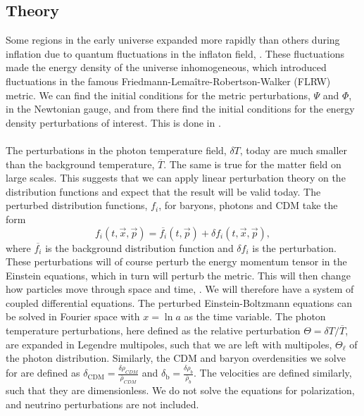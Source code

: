 \documentclass{aa}
\begin{document}
\subsection{Theory}
Some regions in the early universe expanded more rapidly than others during inflation due to quantum fluctuations in the inflaton field, \cite{winther:2023}. These fluctuations
made the energy density of the universe inhomogeneous, which introduced fluctuations in the famous Friedmann-Lemaître-Robertson-Walker (FLRW) metric. We can find the initial conditions for the metric perturbations, $\Psi$ and $\Phi$, in the Newtonian gauge, and from there find the initial conditions for
the energy density perturbations of interest. This is done in \cite{winther:2023}.\\
\noindent
\\
The perturbations in the photon temperature field, $\delta T$, today are much smaller than the background temperature, $\overline{T}$. The same is true for the matter field on large scales.
This suggests that we can apply linear perturbation theory on the distribution functions and expect 
that the result will be valid today. The perturbed distribution functions, $f_i$, for baryons, photons and CDM take the form \[f_i(t,\vec{x},\vec{p})
 = \overline{f_i}(t,\vec{p}) + \delta f_i(t,\vec{x},\vec{p}),\] where $\overline{f_i}$ is the background distribution function and $\delta f_i$ is the perturbation. These perturbations will of course perturb the 
energy momentum tensor in the Einstein equations, which in turn will perturb the metric. This will then change how particles move through space and time, \cite{winther:2023}. We will therefore have a system of coupled differential equations.
The perturbed Einstein-Boltzmann equations can be solved in Fourier space with $x = \ln a$ as the time variable. The photon temperature perturbations, here defined as the relative perturbation $\Theta = \delta T/\overline{T}$, are expanded in Legendre multipoles,
such that we are left with multipoles, $\Theta_\ell$ of the photon distribution. Similarly, the CDM and baryon overdensities we solve for are defined as $\delta_\mathrm{CDM} = \frac{\delta \rho_{CDM}}{\overline{\rho}_{CDM}}$ and $\delta_\mathrm{b} = \frac{\delta \rho_{b}}{\overline{\rho}_{b}}$.
The velocities are defined similarly, such that they are dimensionless. We do not solve the equations for polarization, and neutrino perturbations are not included.\\ 
\end{document}
